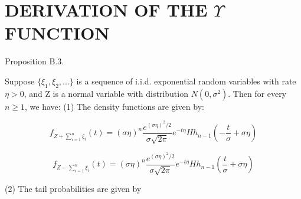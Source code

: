 %
%
%


\chapter{DERIVATION OF THE $\Upsilon$ FUNCTION}%
\label{appendixB}







Proposition B.3.

Suppose $\{\xi_{1},\xi_{2},...\}$ is a sequence of i.i.d. exponential random variables with rate $\eta>0$, and Z is a normal variable with distribution $N(0,\sigma^{2})$. Then for every $ n \geq 1$, we have: (1) The density functions are given by:

$$f_{Z+\sum_{i=1}^{n}\xi_{i}}(t)=(\sigma\eta)^{n}\frac{e^{(\sigma\eta)^{2}/2}}{\sigma\sqrt{2\pi}}e^{-t\eta}Hh_{n-1}(-\frac{t}{\sigma}+\sigma\eta)$$

$$f_{Z-\sum_{i=1}^{n}\xi_{i}}(t)=(\sigma\eta)^{n}\frac{e^{(\sigma\eta)^{2}/2}}{\sigma\sqrt{2\pi}}e^{-t\eta}Hh_{n-1}(\frac{t}{\sigma}+\sigma\eta)$$

(2) The tail probabilities are given by

